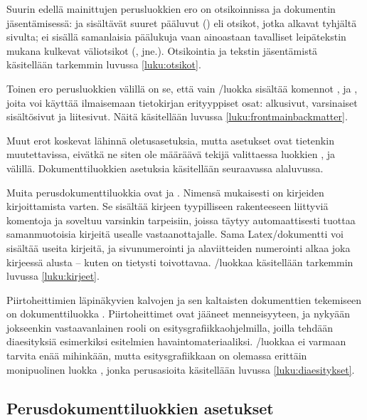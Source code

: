 Suurin edellä mainittujen perusluokkien ero on otsikoinnissa ja
dokumentin jäsentämisessä:  ja 
sisältävät suuret pääluvut () eli otsikot, jotka
alkavat tyhjältä sivulta;  ei sisällä samanlaisia
päälukuja vaan ainoastaan tavalliset leipätekstin mukana kulkevat
väliotsikot (, 
jne.). Otsikointia ja tekstin jäsentämistä käsitellään tarkemmin luvussa
\ref{luku:otsikot}.

Toinen ero perusluokkien välillä on se, että vain
\-/luokka sisältää komennot ,
 ja , joita voi
käyttää ilmaisemaan tietokirjan erityyppiset osat: alkusivut,
varsinaiset sisältösivut ja liitesivut. Näitä käsitellään luvussa
\ref{luku:frontmainbackmatter}.

Muut erot koskevat lähinnä oletusasetuksia, mutta asetukset ovat
tietenkin muutettavissa, eivätkä ne siten ole määräävä tekijä
valittaessa luokkien ,  ja
 välillä. Dokumenttiluokkien asetuksia käsitellään
seuraavassa alaluvussa.

Muita%
 perusdokumenttiluokkia ovat  ja
. Nimensä mukaisesti  on kirjeiden
kirjoittamista varten. Se sisältää kirjeen tyypilliseen rakenteeseen
liittyviä komentoja ja soveltuu varsinkin tarpeisiin, joissa täytyy
automaattisesti tuottaa samanmuotoisia kirjeitä usealle
vas\-taan\-otta\-jalle. Sama Latex\-/dokumentti voi sisältää useita
kirjeitä, ja sivunumerointi ja alaviitteiden numerointi alkaa joka
kirjeessä alusta -- kuten on tietysti toivottavaa.
\-/luokkaa käsitellään tarkemmin luvussa
\ref{luku:kirjeet}.

Piirtoheittimien%
 läpinäkyvien kalvojen ja sen kaltaisten
dokumenttien tekemiseen on dokumenttiluokka .
Piirtoheittimet ovat jääneet menneisyyteen, ja nykyään jokseenkin
vastaavanlainen rooli on esi\-tys\-gra\-fiikka\-ohjel\-milla, joilla
tehdään dia\-esi\-tyk\-siä esimerkiksi esitelmien havaintomateriaaliksi.
\-/luokkaa ei varmaan tarvita enää mihinkään, mutta
esi\-tys\-gra\-fiik\-kaan on olemassa erittäin monipuolinen luokka
, jonka perus\-asioita käsitellään luvussa
\ref{luku:diaesitykset}.

\subsection{Perusdokumenttiluokkien asetukset}

